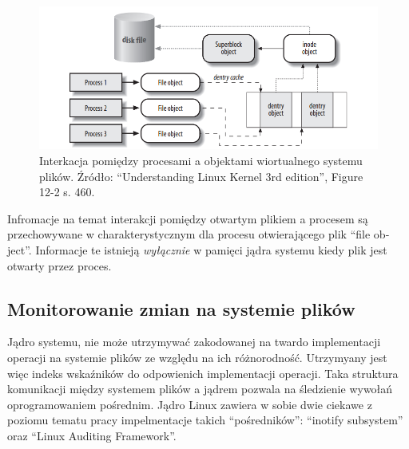 \begin{figure}[H]
    \centering
    \includegraphics[width=0.9\linewidth]{rysunki/interakcjavfs.png}
    \caption{Interkacja pomiędzy procesami a objektami wiortualnego systemu plików.
    Źródło: \foreignquote{english}{Understanding Linux Kernel 3rd edition}, Figure 12-2 s. 460.} 
    \label{fig:enter-label}
\end{figure}
Infromacje na temat interakcji pomiędzy otwartym plikiem a procesem są przechowywane w charakterystycznym dla procesu otwierającego plik \foreignquote{english}{file object}.
Informacje te istnieją \emph{wyłącznie} w pamięci jądra systemu kiedy plik jest otwarty przez proces. 
\subsection{Monitorowanie zmian na systemie plików}
\label{sec:monitorowanie}
Jądro systemu, nie może utrzymywać zakodowanej na twardo implementacji operacji na systemie plików ze względu
na ich różnorodność. Utrzymyany jest więc indeks wskaźników do odpowienich implementacji operacji. Taka struktura komunikacji
między systemem plików a jądrem pozwala na śledzienie wywołań oprogramowaniem pośrednim. Jądro Linux zawiera w sobie dwie ciekawe
z poziomu tematu pracy impelmentacje takich \enquote{pośredników}: \foreignquote{english}{inotify subsystem} oraz \foreignquote{english}{Linux Auditing Framework}.
